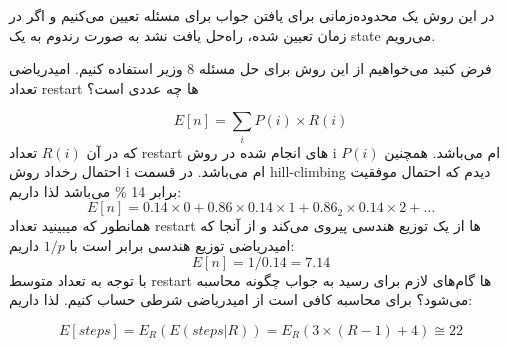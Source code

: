 در این روش یک محدوده‌زمانی برای یافتن جواب برای مسئله تعیین می‌کنیم و اگر در زمان تعیین شده، راه‌حل یافت نشد به صورت رندوم به یک state می‌رویم.

\hfill\break
فرض کنید می‌خواهیم از این روش برای حل مسئله 8 وزیر استفاده کنیم.
امیدریاضی تعداد restart ها چه عددی است؟

\begin{displaymath}
    E[n] = \sum_{i}{P}(i) \times R(i)
\end{displaymath}
که در آن $R(i)$ تعداد restart های انجام شده در روش i ام می‌باشد.
همچنین $P(i)$ احتمال رخداد روش i ام می‌باشد.
\hfill\break
در قسمت hill-climbing دیدم که احتمال موفقیت برابر 14 \% می‌باشد لذا داریم:
\begin{displaymath}
    E[n] = 0.14 \times 0 + 0.86 \times 0.14 \times 1 + 0.86_2 \times 0.14 \times 2 + \dots
\end{displaymath}
همانطور که میبینید تعداد restart ها از یک توزیع هندسی پیروی می‌کند و از آنجا که امیدریاضی توزیع هندسی برابر است با $1/p$ داریم:
\begin{displaymath}
    E[n] = 1/0.14 = 7.14
\end{displaymath}
\hfill\break
با توجه به تعداد متوسط restart ها
گام‌های لازم برای رسید به جواب چگونه محاسبه می‌شود؟
برای محاسبه کافی است از امیدریاضی شرطی حساب کنیم.
لذا داریم:

\begin{displaymath}
    E[steps] = E_{R}(E(steps|R)) = E_{R}(3\times(R - 1) + 4) \cong 22
\end{displaymath}